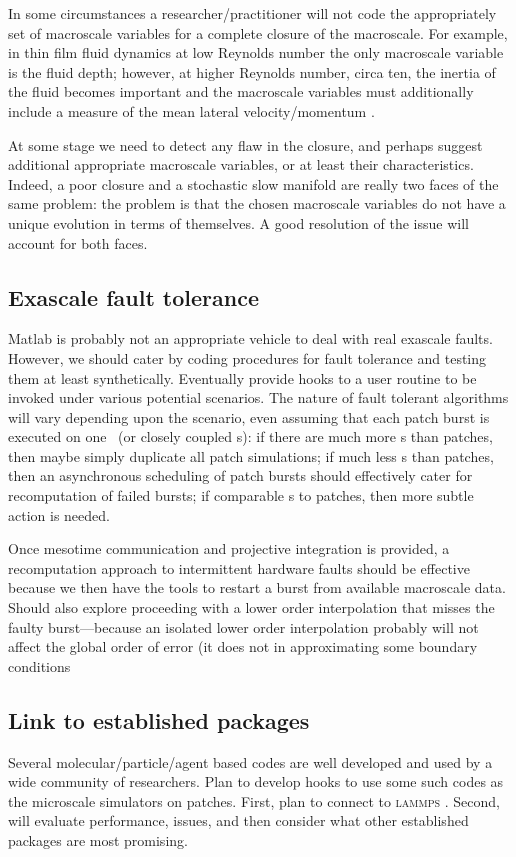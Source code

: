 In some circumstances a researcher\slash practitioner will not code the appropriately set of macroscale variables for a complete closure of the macroscale.
For example, in thin film fluid dynamics at low Reynolds number the only macroscale variable is the fluid depth; however, at higher Reynolds number, circa ten, the inertia of the fluid becomes important and the macroscale variables must additionally include a measure of the mean lateral velocity\slash momentum \citep[e.g.]{Roberts99b}.

At some stage we need to detect any flaw in the closure, and perhaps suggest additional appropriate macroscale variables, or at least their characteristics.
Indeed, a poor closure and a stochastic slow manifold are really two faces of the same problem: the problem is that the chosen macroscale variables do not have a unique evolution in terms of themselves. 
A good resolution of the issue will account for both faces.




\subsection{Exascale fault tolerance}

Matlab is probably not an appropriate vehicle to deal with real exascale faults.  
However, we should cater by coding procedures for fault tolerance and testing them at least synthetically.
Eventually provide hooks to a user routine to be invoked under various potential scenarios.
The nature of fault tolerant algorithms will vary depending upon the scenario, even assuming that each patch burst is executed on one \cpu\ (or closely coupled \cpu{}s): if there are much more \cpu{}s than patches, then maybe simply duplicate all patch simulations;  if much less \cpu{}s than patches, then an asynchronous scheduling of patch bursts should effectively cater for recomputation of failed bursts; if comparable \cpu{}s to patches, then more subtle action is needed.

Once mesotime communication and projective integration is provided, a recomputation approach to intermittent hardware faults should be effective because we then have the tools to restart a burst from available macroscale data.
Should also explore proceeding with a lower order interpolation that misses the faulty burst---because an isolated lower order interpolation probably will not affect the global order of error (it does not in approximating some boundary conditions \citep{Gustafsson1975, Svard2006}




\subsection{Link to established packages}

Several molecular\slash particle\slash agent based codes are well developed and used by a wide community of researchers.  
Plan to develop hooks to use some such codes as the microscale simulators on patches.
First, plan to connect to \textsc{lammps} \cite[]{LAMMPS}.
Second, will evaluate performance, issues, and then consider what other established packages are most promising.

